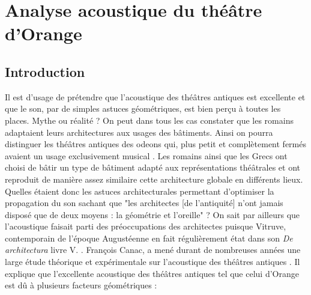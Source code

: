 \part{Analyse acoustique du théâtre d'Orange}
\label{part3}

\chapter*{Introduction}
	
 Il est d'usage de prétendre que l'acoustique des théâtres antiques est excellente et que le son, par de simples astuces géométriques, est bien perçu à toutes les places. Mythe ou réalité ? On peut dans tous les cas constater que les romains adaptaient leurs architectures aux usages des bâtiments. Ainsi on pourra distinguer les théâtres antiques des \glspl{odeon} qui, plus petit et complètement fermés avaient un usage exclusivement musical \cite[p.1]{roofodeon}. Les romains ainsi que les Grecs ont choisi de bâtir un type de bâtiment adapté aux représentations théâtrales et ont reproduit de manière assez similaire cette architecture globale en différents lieux. Quelles étaient donc les astuces architecturales permettant d'optimiser la propagation du son sachant que "les architectes [de l'antiquité] n'ont jamais disposé que de deux moyens : la géométrie et l'oreille" \cite[p.15]{canac} ? On sait par ailleurs que l'acoustique faisait parti des préoccupations des architectes puisque Vitruve, contemporain de l'époque Augustéenne en fait régulièrement état dans son \textit{De architectura} livre V. \cite[Livre V]{vitruve}. François Canac, a mené durant de nombreuses années une large étude théorique et expérimentale sur l'acoustique des théâtres antiques \cite{canac}. Il explique que l'excellente acoustique des théâtres antiques tel que celui d'Orange est dû à plusieurs facteurs géométriques :
